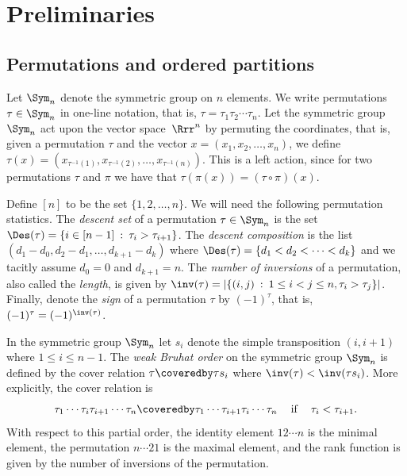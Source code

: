 \section{Preliminaries}
\label{section_preliminaries}

\subsection{Permutations and ordered partitions}

Let $\Sym_{n}$ denote the symmetric group on $n$ elements.
We write permutations $\tau \in \Sym_{n}$ in one-line notation, that is,
$\tau = \tau_{1} \tau_{2} \cdots \tau_{n}$.
Let the symmetric group $\Sym_{n}$ act upon the
vector space~$\Rrr^{n}$ by permuting the coordinates,
that is,
given a permutation $\tau$
and the vector $x = (x_{1}, x_{2}, \ldots, x_{n})$,
we define
$\tau(x) = (x_{\tau^{-1}(1)}, x_{\tau^{-1}(2)}, \ldots, x_{\tau^{-1}(n)})$.
This is a left action, since
for two permutations $\tau$ and $\pi$ we have that
$\tau(\pi(x)) = (\tau \circ \pi)(x)$.

Define $[n]$ to be the set $\{1,2, \ldots, n\}$.
We will need the following permutation statistics.
The \emph{descent set} of a permutation $\tau \in \Sym_{n}$
is the set
$\Des(\tau) = \{i \in [n-1] \: : \: \tau_{i} > \tau_{i+1}\}$.
The \emph{descent composition} is the list
$(d_{1}-d_{0}, d_{2}-d_{1}, \ldots, d_{k+1}-d_{k})$
where $\Des(\tau) = \{d_{1} < d_{2} < \cdots < d_{k}\}$
and we tacitly assume $d_{0} = 0$ and $d_{k+1} = n$.
The \emph{number of inversions} of a permutation, also called the
\emph{length},
is given by
$\inv(\tau) = |\{(i,j) \: : \: 1 \leq i < j \leq n, \tau_{i} > \tau_{j}\}|$.
Finally, denote the \emph{sign} of a permutation $\tau$ by
$(-1)^{\tau}$, that is,
$(-1)^{\tau} = (-1)^{\inv(\tau)}$.

In the symmetric group $\Sym_{n}$
let $s_{i}$ denote the simple transposition $(i,i+1)$
where $1 \leq i \leq n-1$.
The \emph{weak Bruhat order} on the symmetric group $\Sym_{n}$
is defined by the cover relation
$\tau \coveredby \tau s_{i}$ where
$\inv(\tau) < \inv(\tau s_{i})$.
More explicitly, the cover relation is
$$
\tau_{1} \cdots \tau_{i} \tau_{i+1} \cdots \tau_{n}
\coveredby
\tau_{1} \cdots \tau_{i+1} \tau_{i} \cdots \tau_{n}
\:\:\:\:
\text{ if }
\:\:\:\:
\tau_{i} < \tau_{i+1} .
$$
With respect to this partial order,
the identity element $12 \cdots n$ is the minimal element,
the permutation $n \cdots 21$ is the maximal element,
and the rank function is given by the number of inversions
of the permutation.



